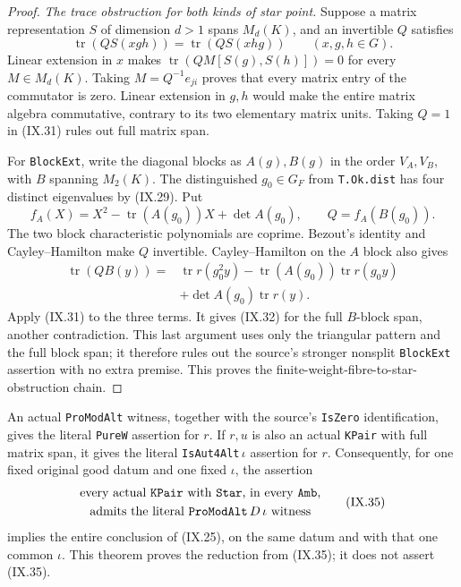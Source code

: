 \begin{proof}
\emph{The trace obstruction for both kinds of star point.}
Suppose a matrix representation $S$ of dimension
$d>1$ spans $M_d(K)$, and an invertible $Q$ satisfies
\[
 \operatorname{tr}(QS(xgh))
                         =\operatorname{tr}(QS(xhg))
                    \qquad(x,g,h\in G).
 \tag{IX.32}
\]
Linear extension in $x$ makes
$\operatorname{tr}(QM[S(g),S(h)])=0$ for every
$M\in M_d(K)$.  Taking
$M=Q^{-1}e_{ji}$ proves that every matrix entry of
the commutator is zero.  Linear extension in $g,h$
would make the entire matrix algebra commutative,
contrary to its two elementary matrix units.
Taking $Q=1$ in (IX.31) rules out full matrix span.

For \texttt{BlockExt}, write the diagonal blocks
as $A(g),B(g)$ in the order $V_A,V_B$, with $B$
spanning $M_2(K)$.  The distinguished $g_0\in G_F$
from \texttt{T.Ok.dist} has four distinct eigenvalues
by (IX.29).  Put
\[
 f_A(X)=X^2-\operatorname{tr}(A(g_0))X+\det A(g_0),
                 \qquad Q=f_A(B(g_0)).
 \tag{IX.33}
\]
The two block characteristic polynomials are coprime.
Bezout's identity and Cayley--Hamilton make $Q$
invertible.  Cayley--Hamilton on the $A$ block also gives
\[
 \begin{split}
 \operatorname{tr}(QB(y))={}&\operatorname{tr}r(g_0^2y)
     -\operatorname{tr}(A(g_0))\operatorname{tr}r(g_0y)\\
     &+\det A(g_0)\operatorname{tr}r(y).
 \end{split}
 \tag{IX.34}
\]
Apply (IX.31) to the three terms.  It gives (IX.32)
for the full $B$-block span, another contradiction.
This last argument uses only the triangular pattern
and the full block span; it therefore rules out the
source's stronger nonsplit \texttt{BlockExt} assertion
with no extra premise.  This proves the
finite-weight-fibre-to-star-obstruction chain.
\end{proof}

\begin{theorem}
\label{claim:IX10}
An actual \texttt{ProModAlt} witness, together with
the source's \texttt{IsZero} identification, gives
the literal \texttt{PureW} assertion for $r$.
If $r,u$ is also an actual \texttt{KPair} with full
matrix span, it gives the literal
\texttt{IsAut4Alt}$\,\iota$ assertion for $r$.
Consequently, for one fixed original good datum and
one fixed $\iota$, the assertion
\[
 \begin{gathered}
 \text{every actual \texttt{KPair} with \texttt{Star},
 in every \texttt{Amb},}\\
 \text{admits the literal \texttt{ProModAlt}$\,D\,\iota$
 witness}
 \end{gathered}
 \tag{IX.35}
\]
implies the entire conclusion of (IX.25), on the same
datum and with that one common $\iota$.
This theorem proves the reduction from (IX.35);
it does not assert (IX.35).
\end{theorem}

